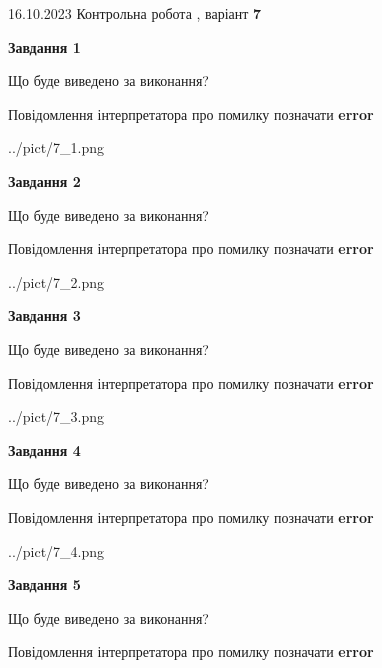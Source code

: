 \documentclass[12pt, ukrainian]{article}
\begin{document}
{\Large{16.10.2023 Контрольна робота , варіант  \No \textbf { 7 }\par}}
{
\begin {large}
{\begin {center}\textbf{Завдання 1}\end {center}}\par
Що буде виведено за виконання? \par
Повідомлення інтерпретатора про помилку позначати \textbf{error}

\begin{center}
	{../pict/7_1.png}
\end{center}
\newpage

{\begin {center}\textbf{Завдання 2}\end {center}}\par
Що буде виведено за виконання? \par
Повідомлення інтерпретатора про помилку позначати \textbf{error}

\begin{center}
	{../pict/7_2.png}
\end{center}
\newpage

{\begin {center}\textbf{Завдання 3}\end {center}}\par
Що буде виведено за виконання? \par
Повідомлення інтерпретатора про помилку позначати \textbf{error}

\begin{center}
	{../pict/7_3.png}
\end{center}
\newpage

{\begin {center}\textbf{Завдання 4}\end {center}}\par
Що буде виведено за виконання? \par
Повідомлення інтерпретатора про помилку позначати \textbf{error}

\begin{center}
	{../pict/7_4.png}
\end{center}
\newpage

{\begin {center}\textbf{Завдання 5}\end {center}}\par
Що буде виведено за виконання? \par
Повідомлення інтерпретатора про помилку позначати \textbf{error}


\end{large}}
\end{document}
